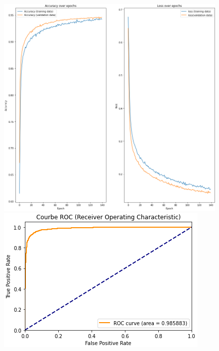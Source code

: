 \documentclass{beamer}
\theoremstyle{definition}
\begin{document}
\begin{frame}
\begin{minipage}[t]{1\linewidth}
\begin{minipage}[t]{0.42\linewidth}
\begin{figure}
		\end{figure}\end{minipage}\hfill 
		\begin{minipage}[t]{0.53\linewidth}\centering\begin{figure}
				\begin{center}
					\centering
					\includegraphics[width=0.7\linewidth]{15.png}
					\includegraphics[width=0.7\linewidth]{16.png}
				\end{center}
				
		\end{figure}\end{minipage}
	\end{minipage}	
\end{frame}
\end{document}
